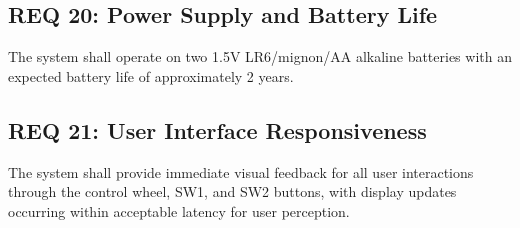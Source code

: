 \subsection*{REQ 20: Power Supply and Battery Life}
\label{subsec:REQ 20: Power Supply and Battery Life}
The system shall operate on two 1.5V LR6/mignon/AA alkaline batteries with an expected battery life of approximately 2 years.

\subsection*{REQ 21: User Interface Responsiveness}
\label{subsec:REQ 21: User Interface Responsiveness}
The system shall provide immediate visual feedback for all user interactions through the control wheel, SW1, and SW2 buttons, with display updates occurring within acceptable latency for user perception.